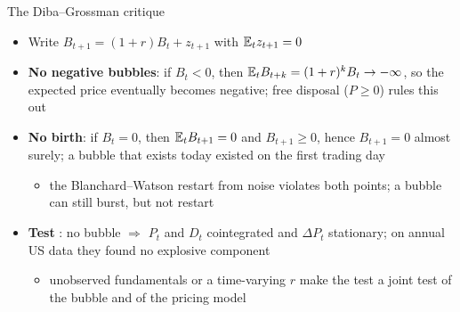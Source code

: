 \begin{frame}{The Diba--Grossman critique}
\itemsize{\small}
\begin{itemize}
    \item Write $B_{t+1} = (1 + r)B_t + z_{t+1}$ with $\mathbb{E}_t z_{t+1} = 0$ 
    \item \textbf{No negative bubbles}: if $B_t < 0$, then $\mathbb{E}_t B_{t+k} = (1 + r)^k B_t \to -\infty$, so the expected price eventually becomes negative; free disposal ($P \ge 0$) rules this out
    \item \textbf{No birth}: if $B_t = 0$, then $\mathbb{E}_t B_{t+1} = 0$ and $B_{t+1} \ge 0$, hence $B_{t+1} = 0$ almost surely; a bubble that exists today existed on the first trading day
    \begin{itemize}
        \item the Blanchard--Watson restart from noise violates both points; a bubble can still burst, but not restart
    \end{itemize}
    \item \textbf{Test} : no bubble $\Rightarrow$ $P_t$ and $D_t$ cointegrated and $\Delta P_t$ stationary; on annual US data they found no explosive component
    \begin{itemize}
        \item unobserved fundamentals or a time-varying $r$ make the test a joint test of the bubble and of the pricing model 
    \end{itemize}
\end{itemize}
\end{frame}

